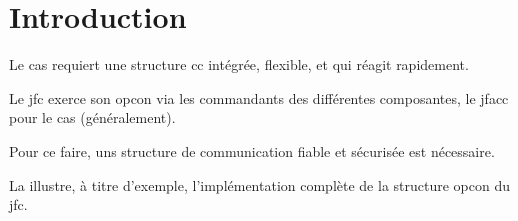 \section{Introduction}

\begin{e1}
	\item Le \gls{cas} requiert une structure \gls{cc} intégrée, flexible, et qui réagit rapidement.
	
	\item Le \gls{jfc} exerce son \gls{opcon} via les commandants des différentes composantes, le \gls{jfacc} pour le \gls{cas} (généralement).
	
	Pour ce faire, uns structure de communication fiable et sécurisée est nécessaire.
	
	La  illustre, à titre d'exemple, l'implémentation complète de la structure \gls{opcon} du \gls{jfc}.
	
\end{e1}

